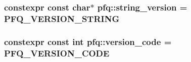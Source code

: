 \subsubsection[{\texorpdfstring{string\+\_\+version}{string_version}}]{\setlength{\rightskip}{0pt plus 5cm}constexpr const char$\ast$ pfq\+::string\+\_\+version = P\+F\+Q\+\_\+\+V\+E\+R\+S\+I\+O\+N\+\_\+\+S\+T\+R\+I\+NG}\hypertarget{namespacepfq_a30c944a281046dafc6e1cd2629cc6e15}{}\label{namespacepfq_a30c944a281046dafc6e1cd2629cc6e15}
\subsubsection[{\texorpdfstring{version\+\_\+code}{version_code}}]{\setlength{\rightskip}{0pt plus 5cm}constexpr const int pfq\+::version\+\_\+code = P\+F\+Q\+\_\+\+V\+E\+R\+S\+I\+O\+N\+\_\+\+C\+O\+DE}\hypertarget{namespacepfq_a7a40dd66aee22cafaf240382a6d965ab}{}\label{namespacepfq_a7a40dd66aee22cafaf240382a6d965ab}
